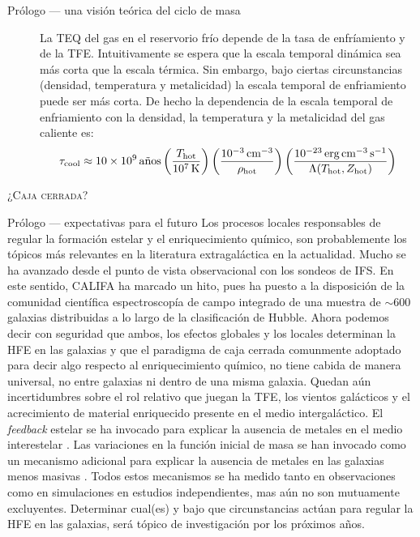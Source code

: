 \documentclass[xcolor=dvipsnames,4pt,hyperref={colorlinks,citecolor=black,linkcolor=black,urlcolor=black}]{beamer}
\begin{document}
\begin{frame}[allowframebreaks]{Prólogo --- una visión teórica del ciclo de masa}
\begin{description}
La TEQ del gas en el reservorio frío depende de la tasa de enfríamiento y de la TFE. Intuitivamente
se espera que la escala temporal dinámica sea más corta que la escala térmica. Sin embargo, bajo
ciertas circunstancias (densidad, temperatura y metalicidad) la escala temporal de enfriamiento
puede ser más corta.
De hecho la dependencia de la escala temporal de enfriamiento con la densidad, la temperatura y la
metalicidad del gas caliente es:
%
\begin{equation}
\tau_\text{cool}\approx10\times10^9\,\text{años}\left(\frac{T_\text{hot}}{10^7\,\text{K}}\right)\left(\frac{10^{-3}\,\text{cm}^{-3}}{\rho_\text{hot}}\right)\left(\frac{10^{-23}\,\text{erg\,cm}^{-3}\,\text{s}^{-1}}{\Lambda(T_\text{hot},Z_\text{hot})}\right)
\end{equation}
%
\item[\textsc{¿Caja cerrada?}]
%
\end{description}
\end{frame}

\begin{frame}[allowframebreaks]{Prólogo --- expectativas para el futuro}
%
Los procesos locales responsables de regular la formación estelar y el enriquecimiento químico, son
probablemente los tópicos más relevantes en la literatura extragaláctica en la actualidad. Mucho se
ha avanzado desde el punto de vista observacional con los sondeos de IFS. En este sentido, CALIFA ha
marcado un hito, pues ha puesto a la disposición de la comunidad científica espectroscopía de campo
integrado de una muestra de $\sim600$ galaxias distribuidas a lo largo de la clasificación de
Hubble. Ahora podemos decir con seguridad que ambos, los efectos globales y los locales determinan
la HFE en las galaxias y que el paradigma de caja cerrada comunmente adoptado para decir algo
respecto al enriquecimiento químico, no tiene cabida de manera universal, no entre galaxias ni
dentro de una misma galaxia. Quedan aún incertidumbres sobre el rol relativo que juegan la TFE, los
vientos galácticos y el acrecimiento de material enriquecido presente en el medio intergaláctico. El
\emph{feedback} estelar se ha invocado para explicar la ausencia de metales en el medio interestelar
\citep{Tremonti2004, Kobayashi2007}. Las variaciones en la función inicial de masa se han invocado
como un mecanismo adicional para explicar la ausencia de metales en las galaxias menos masivas
\citep{Koppen2007}. Todos estos mecanismos se ha medido tanto en observaciones como en simulaciones
en estudios independientes, mas aún no son mutuamente excluyentes. Determinar cual(es) y bajo que
circunstancias actúan para regular la HFE en las galaxias, será tópico de investigación por los
próximos años.
%
\end{frame}
\end{document}
